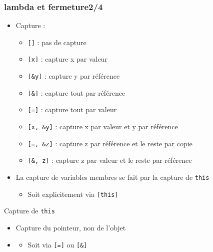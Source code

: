 \documentclass[C++.tex]{subfiles}
\begin{document}
\begin{frame}[fragile]
	\frametitle{lambda et fermeture\titlehfill{}2/4}
	\begin{itemize}
		\item Capture :
		\begin{itemize}
			\item{} \lstinline|[]| : pas de capture
			\item{} \lstinline|[x]| : capture x par valeur
			\item{} \lstinline|[&y]| : capture y par référence
			\item{} \lstinline|[&]| : capture tout par référence
			\item{} \lstinline|[=]|  : capture tout par valeur
			\item{} \lstinline|[x, &y]| : capture x par valeur et y par référence
			\item{} \lstinline|[=, &z]| : capture z par référence et le reste par copie
			\item{} \lstinline|[&, z]| : capture z par valeur et le reste par référence
		\end{itemize}

		\item La capture de variables membres se fait par la capture de  \lstinline|this|
		\begin{itemize}
			\item Soit explicitement via \lstinline|[this]|
		\end{itemize}
	\end{itemize}

	\begin{alertblock}{Capture de \lstinline|this|}
		\begin{itemize}
			\item Capture du pointeur, non de l'objet
		\end{itemize}
	
	\end{alertblock}
			
	\begin{itemize}
		\item [] \begin{itemize}
			\item Soit via \lstinline|[=]| ou \lstinline|[&]|

		\end{itemize}
	\end{itemize}
\end{frame}
\end{document}
